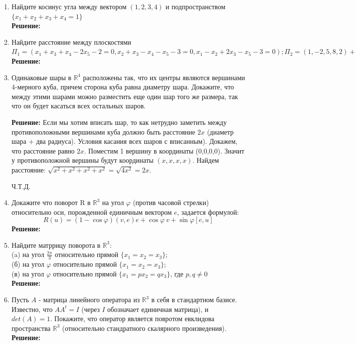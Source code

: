 \documentclass[]{book}
\theoremstyle{definition}
\newcommand{\bb}[1]{\mathbb{#1}}
\begin{document}
\begin{enumerate}[resume]
\item Найдите косинус угла между вектором $(1,2,3,4)$ и подпространством $\{x_1+x_2+x_3+x_4=1\}$\\
\textbf{Решение:}\\


\item Найдите расстояние между плоскостями $\Pi_1=(x_1 + x_3 +x_4 - 2x_5 -2=0, x_2 +x_3 -x_4 -x_5 -3=0, x_1 -x_2 +2x_3 -x_5 -3=0); \Pi_2=(1,-2,5,8,2)+ (0,1,2,1,2),(2,1,2,-1,1) $\\
\textbf{Решение:}\\

\item Одинаковые шары в $\bb{R}^4$ расположены так, что их центры являются вершинами 4-мерного куба, причем сторона куба равна диаметру шара. Докажите, что между этими шарами можно разместить еще один шар того же размера, так что он будет касаться всех остальных шаров.

\textbf{Решение:}
Если мы хотим вписать шар, то как нетрудно заметить между противоположными вершинами куба должно быть расстояние $2x$ (диаметр шара $+$ два радиуса). Условия касания всех шаров с вписанным). Докажем, что расстояние равно $2x$. Поместим 1 вершину в координаты (0,0,0,0). Значит у противоположной вершины будут координаты $(x,x,x,x)$. Найдем расстояние: $\sqrt{x^{2} + x^{2} + x^{2} + x^{2}}=\sqrt{4x^{2}}=2{x}$.

Ч.Т.Д.



\item Докажите что поворот R в $\bb{R}^{3}$ на угол $\varphi$ (против часовой стрелки) относительно оси, порожденной единичным вектором $e$, задается формулой:
$$R(u)=(1-\cos{\varphi})(v,e)e+\cos{\varphi}\ v+\sin{\varphi}[e,u]$$
\textbf{Решение:}

\item Найдите матррицу поворота в $\bb{R}^{3}$:\\
(a) на угол $\frac{2\pi}{3}$ относительно прямой $\{x_1=x_2=x_3\}$;\\
(б) на угол $\varphi$ относительно прямой $\{x_1=x_2=x_3\}$;\\
(в) на угол $\varphi$ относительно прямой $\{x_1=px_2=qx_3\}$, где $p, q\neq 0$\\
\textbf{Решение:}

\item Пусть $A$ - матрица линейного оператора из $\bb{R}^{3}$ в себя в стандартном базисе. Известно, что $AA^{t} = I$ (через $I$ обозначает единичная матрица),  и $det(A) =1$. Покажите, что оператор является повротом евклидова пространства $\bb{R}^{3}$ (относительно стандратного скалярного произведения).\\
\textbf{Решение:}

\end{enumerate}
\end{document}
